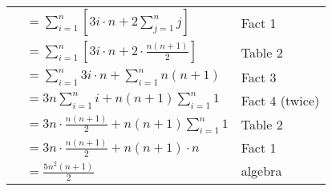 \begin{questions}
\begin{solution}
\begin{tabular}{rll}
   & $\displaystyle = \sum_{i=1}^n \left[ 3i\cdot n + 2 \sum_{j=1}^n j \right]$ & Fact 1  \\
   & $\displaystyle = \sum_{i=1}^n \left[ 3i\cdot n + 2 \cdot \frac{n(n+1)}{2} \right]$ & Table 2 \\
   & $\displaystyle = \sum_{i=1}^n 3i\cdot n + \sum_{i=1}^n n(n+1)$ & Fact 3 \\
   & $\displaystyle = 3n \sum_{i=1}^n i + n(n+1) \sum_{i=1}^n 1$ & Fact 4 (twice) \\
   & $\displaystyle = 3n \cdot \frac{n(n+1)}{2} + n(n+1) \sum_{i=1}^n 1$ & Table 2 \\
   & $\displaystyle = 3n \cdot \frac{n(n+1)}{2} + n(n+1)\cdot n$ & Fact 1 \\
   & $\displaystyle = \frac{5n^2(n+1)}{2} $ & algebra \\
\end{tabular}
\end{solution}







\end{questions}
